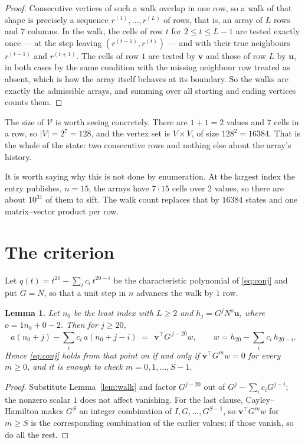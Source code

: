 \documentclass[11pt,a4paper]{article}
\theoremstyle{plain}
\newtheorem{lemma}[theorem]{Lemma}
\theoremstyle{definition}
\begin{document}
\begin{proof}
Consecutive vertices of such a walk overlap in one row, so a walk of that shape is
precisely a sequence $r^{(1)},\dots,r^{(L)}$ of rows, that is, an array of $L$ rows
and $7$ columns. In the walk, the cells of row $t$ for $2\le t\le L-1$ are tested
exactly once --- at the step leaving $(r^{(t-1)},r^{(t)})$ --- and with their true
neighbours $r^{(t-1)}$ and $r^{(t+1)}$. The cells of row $1$ are tested by
$\mathbf{v}$ and those of row $L$ by $\mathbf{u}$, in both cases by the same condition
with the missing neighbour row treated as absent, which is how the array itself behaves at
its boundary. So the walks are exactly the admissible arrays, and summing over all starting
and ending vertices counts them.
\end{proof}


The size of $\mathcal V$ is worth seeing concretely. There are $1+1=2$ values
and $7$ cells in a row, so $|V|=2^{7}=128$, and the vertex set is
$V\times V$, of size $128^2=16384$. That is the whole of the state: two consecutive
rows and nothing else about the array's history.

It is worth saying why this is not done by enumeration. At the largest index the entry
publishes, $n=15$, the arrays have $7\cdot15$ cells over
$2$ values, so there are about $10^{31}$ of them to sift. The
walk count replaces that by $16384$ states and one matrix--vector product per row.
\section{The criterion}

Let $q(t)=t^{20}-\sum_i c_i\,t^{20-i}$ be the characteristic polynomial of
\eqref{eq:conj} and put $G=N$, so that a unit step in $n$ advances the walk by
$1$ row.

\begin{lemma}\label{lem:crit}
Let $n_0$ be the least index with $L\ge2$ and $h_j=G^{j}N^{o}\mathbf{u}$, where
$o=1n_0+0-2$. Then for $j\ge20$,
\[
a(n_0+j)-\sum_i c_i\,a(n_0+j-i)\;=\;\,\mathbf{v}^{\!\top}G^{\,j-20}w,
\qquad w=h_{20}-\sum_i c_i\,h_{20-i} .
\]
Hence \eqref{eq:conj} holds from that point on if and only if
$\mathbf{v}^{\!\top}G^{m}w=0$ for every $m\ge0$, and it is enough to check
$m=0,1,\dots,S-1$.
\end{lemma}

\begin{proof}
Substitute Lemma~\ref{lem:walk} and factor $G^{j-20}$ out of
$G^{j}-\sum_ic_iG^{j-i}$; the nonzero scalar $1$ does not affect
vanishing. For the last clause, Cayley--Hamilton makes $G^{S}$ an integer combination of
$I,G,\dots,G^{S-1}$, so $\mathbf{v}^{\!\top}G^{m}w$ for $m\ge S$ is the corresponding
combination of the earlier values; if those vanish, so do all the rest.
\end{proof}
\end{document}
